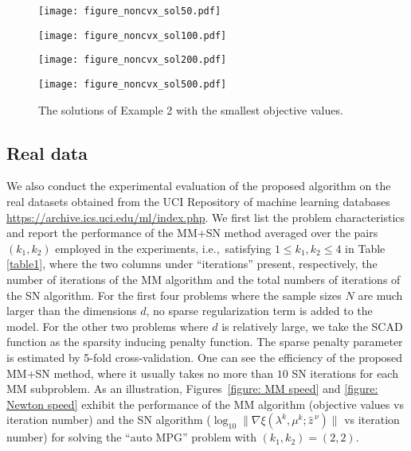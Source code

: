 \documentclass{siamart}
\newcommand{\wh}{\widehat}
\begin{document}
\begin{figure}[H]
\centering
\begin{minipage}{.24\textwidth}
\centering
\texttt{[image: figure\_noncvx\_sol50.pdf]}
\end{minipage}%
\begin{minipage}{.24\textwidth}
\centering
\texttt{[image: figure\_noncvx\_sol100.pdf]}
\end{minipage}
\begin{minipage}{.24\textwidth}
\centering
\texttt{[image: figure\_noncvx\_sol200.pdf]}
\end{minipage}
\begin{minipage}{.24\textwidth}
\centering
\texttt{[image: figure\_noncvx\_sol500.pdf]}
\end{minipage}
\caption{\small{The solutions of Example 2 with the smallest objective values.}}
\label{figure:noncvx:result}
\end{figure}

\subsection{Real data}\label{section: pwa regression: real data}

We also conduct the experimental evaluation of the proposed  algorithm on the real datasets obtained from the UCI Repository of machine learning
databases \url{https://archive.ics.uci.edu/ml/index.php}.
We first list the problem characteristics and report the performance of the MM+SN method averaged over the pairs $(k_1,k_2)$
employed in the experiments, i.e.,\ satisfying $1\leq k_1, k_2\leq 4$ in Table \ref{table1}, where the two columns under ``iterations'' present, respectively, the number of iterations
of the MM algorithm and the total numbers of iterations of the SN algorithm.
For the first four problems where the sample sizes $N$ are much larger than the dimensions $d$,  no sparse regularization term is added to the model.
For the other two problems where $d$ is relatively large, we take the SCAD function as the sparsity inducing penalty function.
The sparse penalty parameter is estimated by  5-fold cross-validation.
One can see the efficiency of the proposed MM+SN method, where it usually takes no more than $10$
SN iterations for each MM subproblem.  As an illustration,
Figures~\ref{figure: MM speed} and \ref{figure: Newton speed} exhibit the performance of the MM algorithm (objective values vs iteration number) and the
SN algorithm ($\log_{10}\|\nabla \xi(\lambda^k, \mu^k;\wh{z}^{\,\nu})\|$ vs iteration number) for solving the ``auto MPG'' problem with $(k_1,k_2) = (2,2)$.
\end{document}

